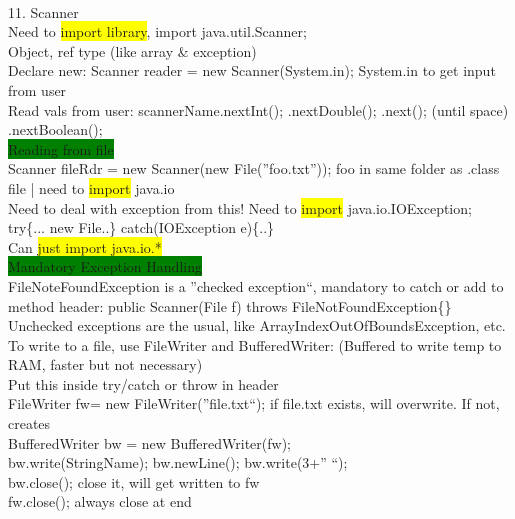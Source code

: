 ~\\ \color{Brown}
11. Scanner
\\ Need to \colorbox{Yellow}{import library}, import java.util.Scanner;
\\ Object, ref type (like array \& exception)
\\ Declare new: Scanner reader = new Scanner(System.in); System.in to get input from user
\\ Read vals from user: scannerName.nextInt(); .nextDouble(); .next(); (until space) .nextBoolean();
\\ \colorbox{Green}{Reading from file} 
\\ Scanner fileRdr = new Scanner(new File(''foo.txt'')); foo in same folder as .class file | need to \colorbox{Yellow}{import} java.io
\\ Need to deal with exception from this! Need to \colorbox{Yellow}{import} java.io.IOException;
\\ try\{... new File..\} catch(IOException e)\{..\}
\\ Can \colorbox{Yellow}{just import java.io.*}
\\ \colorbox{Green}{Mandatory Exception Handling}
\\ FileNoteFoundException is a ''checked exception``, mandatory to catch or add to method header: public Scanner(File f) throws FileNotFoundException\{\}
\\ Unchecked exceptions are the usual, like ArrayIndexOutOfBoundsException, etc.
\\ To write to a file, use FileWriter and BufferedWriter: (Buffered to write temp to RAM, faster but not necessary)
\\ Put this inside try/catch or throw in header
\\ FileWriter fw= new FileWriter(''file.txt``); if file.txt exists, will overwrite. If not, creates
\\ BufferedWriter bw = new BufferedWriter(fw);
\\ bw.write(StringName); bw.newLine(); bw.write(3+'' ``);
\\ bw.close(); close it, will get written to fw
\\ fw.close(); always close at end